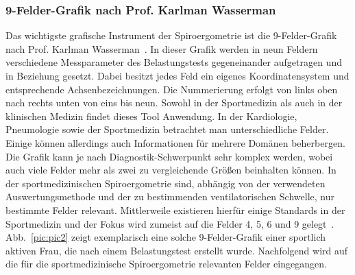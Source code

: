 \subsubsection{9-Felder-Grafik nach Prof. Karlman Wasserman}
%
Das wichtigste grafische Instrument der Spiroergometrie ist die 9-Felder-Grafik nach Prof. Karlman Wasserman~\cite{Wasserman.2012}. In dieser Grafik werden in neun Feldern verschiedene Messparameter des Belastungstests gegeneinander aufgetragen und in Beziehung gesetzt. Dabei besitzt jedes Feld ein eigenes Koordinatensystem und entsprechende Achsenbezeichnungen. Die Nummerierung erfolgt von links oben nach rechts unten von eins bis neun. Sowohl in der Sportmedizin als auch in der klinischen Medizin findet dieses Tool Anwendung. In der Kardiologie, Pneumologie sowie der Sportmedizin betrachtet man unterschiedliche Felder. Einige können allerdings auch Informationen für mehrere Domänen beherbergen. Die Grafik kann je nach Diagnostik-Schwerpunkt sehr komplex werden, wobei auch viele Felder mehr als zwei zu vergleichende Größen beinhalten können. In der sportmedizinischen Spiroergometrie sind, abhängig von der verwendeten Auswertungsmethode und der zu bestimmenden ventilatorischen Schwelle, nur bestimmte Felder relevant. Mittlerweile existieren hierfür einige Standards in der Sportmedizin und der Fokus wird zumeist auf die Felder 4, 5, 6 und 9 gelegt~\cite{ScharhagRosenberger.2013}. Abb.~\ref{pic:pic2} zeigt exemplarisch eine solche 9-Felder-Grafik einer sportlich aktiven Frau, die nach einem Belastungstest erstellt wurde. Nachfolgend wird auf die für die sportmedizinische Spiroergometrie relevanten Felder eingegangen.
%
